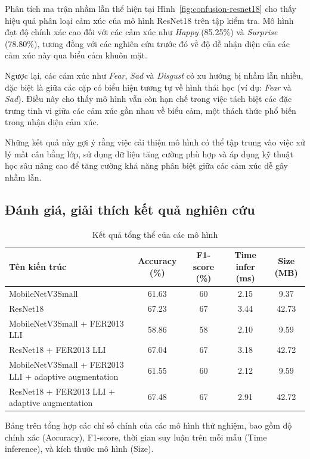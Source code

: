 Phân tích ma trận nhầm lẫn thể hiện tại Hình~\ref{fig:confusion-resnet18} cho thấy hiệu quả phân loại cảm xúc của mô hình ResNet18 trên tập kiểm tra. Mô hình đạt độ chính xác cao đối với các cảm xúc như \textit{Happy} (85.25\%) và \textit{Surprise} (78.80\%), tương đồng với các nghiên cứu trước đó về độ dễ nhận diện của các cảm xúc này qua biểu cảm khuôn mặt.

Ngược lại, các cảm xúc như \textit{Fear}, \textit{Sad} và \textit{Disgust} có xu hướng bị nhầm lẫn nhiều, đặc biệt là giữa các cặp có biểu hiện tương tự về hình thái học (ví dụ: \textit{Fear} và \textit{Sad}). Điều này cho thấy mô hình vẫn còn hạn chế trong việc tách biệt các đặc trưng tinh vi giữa các cảm xúc gần nhau về biểu cảm, một thách thức phổ biến trong nhận diện cảm xúc.

Những kết quả này gợi ý rằng việc cải thiện mô hình có thể tập trung vào việc xử lý mất cân bằng lớp, sử dụng dữ liệu tăng cường phù hợp và áp dụng kỹ thuật học sâu nâng cao để tăng cường khả năng phân biệt giữa các cảm xúc dễ gây nhầm lẫn.


\subsection{Đánh giá, giải thích kết quả nghiên cứu}

\begin{table}[H]
\centering
\caption{Kết quả tổng thể của các mô hình}
\begin{tabular}{@{}>{\raggedright\arraybackslash}p{5cm}cccc@{}}
\toprule
\textbf{Tên kiến trúc} & \textbf{Accuracy (\%)} & \textbf{F1-score (\%)} & \textbf{Time infer (ms)} & \textbf{Size (MB)} \\ \midrule
MobileNetV3Small & 61.63 & 60 & 2.15 & 9.37 \\
ResNet18 & 67.23 & 67 & 3.44 & 42.73 \\
MobileNetV3Small + FER2013 LLI & 58.86 & 58 & 2.10 & 9.59 \\
ResNet18 + FER2013 LLI & 67.04 & 67 & 3.18 & 42.72 \\
MobileNetV3Small + FER2013 LLI + adaptive augmentation & 61.55 & 60 & 2.12 & 9.59 \\
ResNet18 + FER2013 LLI + adaptive augmentation & 67.48 & 67 & 2.91 & 42.72 \\ \bottomrule
\end{tabular}
\label{tab:overall-results}
\end{table}

Bảng trên tổng hợp các chỉ số chính của các mô hình thử nghiệm, bao gồm độ chính xác (Accuracy), F1-score, thời gian suy luận trên mỗi mẫu (Time inference), và kích thước mô hình (Size). 

